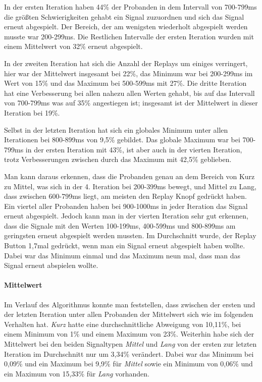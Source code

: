 In der ersten Iteration haben 44\% der Probanden in dem Intervall von 700-799ms die gr{\"o}{\ss}ten Schwierigkeiten gehabt ein Signal zuzuordnen und sich das Signal erneut abgespielt. 
Der Bereich, der am wenigsten wiederholt abgespielt werden musste war 200-299ms. 
Die Restlichen Intervalle der ersten Iteration wurden mit einem Mittelwert von 32\% erneut abgespielt.

In der zweiten Iteration hat sich die Anzahl der Replays um einiges verringert, hier war der Mittelwert insgesamt bei 22\%, das Minimum war bei 200-299ms im Wert von 15\% und das Maximum bei 500-599ms mit 27\%.  
Die dritte Iteration hat eine Verbesserung bei allen nahezu allen Werten gehabt, bis auf das Intervall von 700-799ms was auf 35\% angestiegen ist; insgesamt ist der Mittelwert in dieser Iteration bei 19\%. 

Selbst in der letzten Iteration hat sich ein globales Minimum unter allen Iterationen bei 800-899ms von 9,5\% gebildet. Das globale Maximum war bei 700-799ms in der ersten Iteration mit 43\%, ist aber auch in der vierten Iteration, trotz Verbesserungen zwischen durch das Maximum mit 42,5\% geblieben. 

Man kann daraus erkennen, dass die Probanden genau an dem Bereich von Kurz zu Mittel, was sich in der 4. Iteration bei 200-399ms bewegt, und Mittel zu Lang, dass zwischen 600-799ms liegt, am meisten den Replay Knopf gedr{\"u}ckt haben. 
Ein viertel aller Probanden haben bei 900-1000ms in jeder Iteration das Signal erneut abgespielt. 
Jedoch kann man in der vierten Iteration sehr gut erkennen, dass die Signale mit den Werten 100-199ms, 400-599ms und 800-899ms am geringsten erneut abgespielt werden mussten.
Im Durchschnitt wurde, der Replay Button 1,7mal gedr{\"u}ckt, wenn man ein Signal erneut abgespielt haben wollte. 
Dabei war das Minimum einmal und das Maximum neun mal, dass man das Signal erneut abspielen wollte.

\paragraph{Mittelwert}
Im Verlauf des Algorithmus konnte man feststellen, dass zwischen der ersten und der letzten Iteration unter allen Probanden der Mittelwert sich wie im folgenden Verhalten hat. 
\textit{Kurz} hatte eine durchschnittliche Abweigung von 10,11\%, bei einem Minimum von 1\% und einem Maximum von 23\%. 
Weiterhin habe sich der Mittelwert bei den beiden Signaltypen \textit{Mittel} und \textit{Lang} von der ersten zur letzten Iteration im Durchschnitt nur um 3,34\% ver{\"a}ndert.
Dabei war das Minimum bei 0,09\% und ein Maximum bei 9,9\% f{\"u}r \textit{Mittel} sowie ein Minimum von 0,06\% und ein Maximum von 15,33\% f{\"u}r \textit{Lang} vorhanden.

